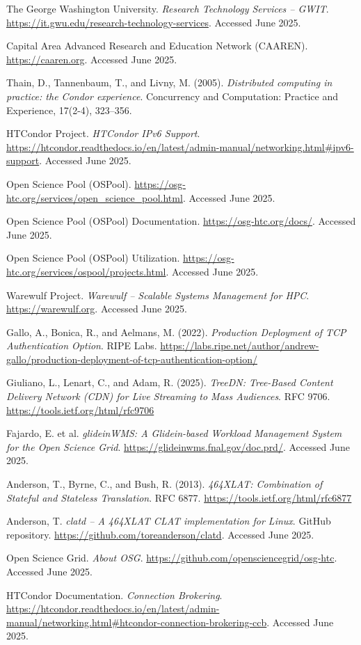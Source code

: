 \documentclass[11pt]{article}
\begin{document}
\begin{thebibliography}{99}
The George Washington University. \textit{Research Technology Services – GWIT}. \url{https://it.gwu.edu/research-technology-services}. Accessed June 2025.

Capital Area Advanced Research and Education Network (CAAREN). \url{https://caaren.org}. Accessed June 2025.

Thain, D., Tannenbaum, T., and Livny, M. (2005). \textit{Distributed computing in practice: the Condor experience}. Concurrency and Computation: Practice and Experience, 17(2-4), 323–356.

HTCondor Project. \textit{HTCondor IPv6 Support}. \url{https://htcondor.readthedocs.io/en/latest/admin-manual/networking.html#ipv6-support}. Accessed June 2025.

Open Science Pool (OSPool). \url{https://osg-htc.org/services/open_science_pool.html}. Accessed June 2025.


Open Science Pool (OSPool) Documentation. \url{https://osg-htc.org/docs/}. Accessed June 2025.

Open Science Pool (OSPool) Utilization. \url{https://osg-htc.org/services/ospool/projects.html}. Accessed June 2025.

Warewulf Project. \textit{Warewulf – Scalable Systems Management for HPC}. \url{https://warewulf.org}. Accessed June 2025.

Gallo, A., Bonica, R., and Aelmans, M. (2022). \textit{Production Deployment of TCP Authentication Option}. RIPE Labs. \url{https://labs.ripe.net/author/andrew-gallo/production-deployment-of-tcp-authentication-option/}

Giuliano, L., Lenart, C., and Adam, R. (2025). \textit{TreeDN: Tree-Based Content Delivery Network (CDN) for Live Streaming to Mass Audiences}. RFC 9706. \url{https://tools.ietf.org/html/rfc9706}

Fajardo, E. et al. \textit{glideinWMS: A Glidein-based Workload Management System for the Open Science Grid}. \url{https://glideinwms.fnal.gov/doc.prd/}. Accessed June 2025.

Anderson, T., Byrne, C., and Bush, R. (2013). \textit{464XLAT: Combination of Stateful and Stateless Translation}. RFC 6877. \url{https://tools.ietf.org/html/rfc6877}

Anderson, T. \textit{clatd – A 464XLAT CLAT implementation for Linux}. GitHub repository. \url{https://github.com/toreanderson/clatd}. Accessed June 2025.


Open Science Grid. \textit{About OSG}. \url{https://github.com/opensciencegrid/osg-htc}. Accessed June 2025.


HTCondor Documentation. \textit{Connection Brokering}. \url{https://htcondor.readthedocs.io/en/latest/admin-manual/networking.html#htcondor-connection-brokering-ccb}. Accessed June 2025.

\end{thebibliography}
\end{document}
